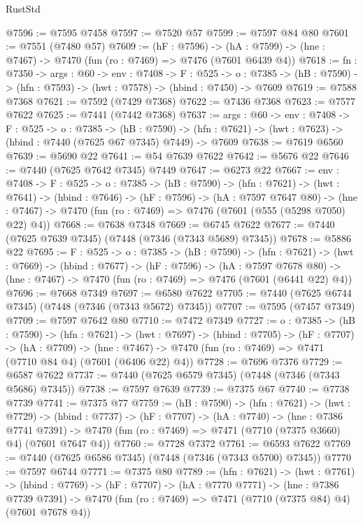 \begin{lexlean}{RustStd}
\begin{coremodule}
@7596 := @7595 @7458
@7597 := @7520 @57
@7599 := @7597 @84 @80
@7601 := @7551 (@7480 @57)
@7609 := (hF : @7596) ->
  (hA : @7599) -> (hne : @7467) -> @7470 (fun (ro : @7469) => @7476 (@7601 @6439 @4))
@7618 := {fn : @7350} ->
  {args : @60} ->
  {env : @7408} ->
  {F : @525} ->
  {o : @7385} -> (hB : @7590) -> (hfn : @7593) -> (hwt : @7578) -> (hbind : @7450) -> @7609
@7619 := @7588 @7368
@7621 := @7592 (@7429 @7368)
@7622 := @7436 @7368
@7623 := @7577 @7622
@7625 := @7441 (@7442 @7368)
@7637 := {args : @60} ->
  {env : @7408} ->
  {F : @525} ->
  {o : @7385} ->
  (hB : @7590) -> (hfn : @7621) -> (hwt : @7623) -> (hbind : @7440 (@7625 @67 @7345) @7449) -> @7609
@7638 := @7619 @6560
@7639 := @5690 @22
@7641 := @54 @7639 @7622
@7642 := @5676 @22
@7646 := @7440 (@7625 @7642 @7345) @7449
@7647 := @6273 @22
@7667 := {env : @7408} ->
  {F : @525} ->
  {o : @7385} ->
  (hB : @7590) ->
  (hfn : @7621) ->
  (hwt : @7641) ->
  (hbind : @7646) ->
  (hF : @7596) ->
  (hA : @7597 @7647 @80) ->
  (hne : @7467) -> @7470 (fun (ro : @7469) => @7476 (@7601 (@555 (@5298 @7050) @22) @4))
@7668 := @7638 @7348
@7669 := @6745 @7622
@7677 := @7440 (@7625 @7639 @7345) (@7448 (@7346 (@7343 @5689) @7345))
@7678 := @5886 @22
@7695 := {F : @525} ->
  {o : @7385} ->
  (hB : @7590) ->
  (hfn : @7621) ->
  (hwt : @7669) ->
  (hbind : @7677) ->
  (hF : @7596) ->
  (hA : @7597 @7678 @80) ->
  (hne : @7467) -> @7470 (fun (ro : @7469) => @7476 (@7601 (@6441 @22) @4))
@7696 := @7668 @7349
@7697 := @6580 @7622
@7705 := @7440 (@7625 @6744 @7345) (@7448 (@7346 (@7343 @5672) @7345))
@7707 := @7595 (@7457 @7349)
@7709 := @7597 @7642 @80
@7710 := @7472 @7349
@7727 := {o : @7385} ->
  (hB : @7590) ->
  (hfn : @7621) ->
  (hwt : @7697) ->
  (hbind : @7705) ->
  (hF : @7707) ->
  (hA : @7709) ->
  (hne : @7467) -> @7470 (fun (ro : @7469) => @7471 (@7710 @84 @4) (@7601 (@6406 @22) @4))
@7728 := @7696 @7376
@7729 := @6587 @7622
@7737 := @7440 (@7625 @6579 @7345) (@7448 (@7346 (@7343 @5686) @7345))
@7738 := @7597 @7639
@7739 := @7375 @67
@7740 := @7738 @7739
@7741 := @7375 @77
@7759 := (hB : @7590) ->
  (hfn : @7621) ->
  (hwt : @7729) ->
  (hbind : @7737) ->
  (hF : @7707) ->
  (hA : @7740) ->
  (hne : @7386 @7741 @7391) ->
  @7470 (fun (ro : @7469) => @7471 (@7710 (@7375 @3660) @4) (@7601 @7647 @4))
@7760 := @7728 @7372
@7761 := @6593 @7622
@7769 := @7440 (@7625 @6586 @7345) (@7448 (@7346 (@7343 @5700) @7345))
@7770 := @7597 @6744
@7771 := @7375 @80
@7789 := (hfn : @7621) ->
  (hwt : @7761) ->
  (hbind : @7769) ->
  (hF : @7707) ->
  (hA : @7770 @7771) ->
  (hne : @7386 @7739 @7391) ->
  @7470 (fun (ro : @7469) => @7471 (@7710 (@7375 @84) @4) (@7601 @7678 @4))

\end{coremodule}
\end{lexlean}
